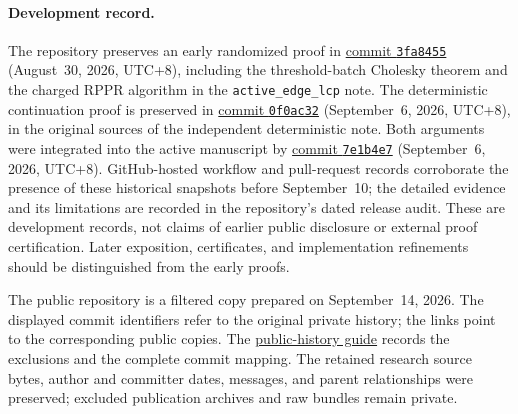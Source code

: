 \paragraph{Development record.}
The repository preserves an early randomized proof in
\href{https://github.com/baojian/hybrid-local-solver/commit/9ebb285da402e0ddf3cdc621240b5502a822b61f}{commit \texttt{3fa8455}}
(August~30, 2026, UTC+8), including the threshold-batch Cholesky theorem
and the charged RPPR algorithm in the \texttt{active\_edge\_lcp} note.
The deterministic continuation proof is preserved in
\href{https://github.com/baojian/hybrid-local-solver/commit/d97d280560ba8dd085813d11737dad96c2552221}{commit \texttt{0f0ac32}}
(September~6, 2026, UTC+8), in the original sources of the independent
deterministic note. Both arguments were integrated into the active
manuscript by
\href{https://github.com/baojian/hybrid-local-solver/commit/cb67f5fd258e039fe931a1c99f6d98ec3ec3141f}{commit \texttt{7e1b4e7}}
(September~6, 2026, UTC+8).
GitHub-hosted workflow and pull-request records corroborate the presence
of these historical snapshots before September~10; the detailed evidence
and its limitations are recorded in the repository's dated release audit.
These are development records, not claims of earlier public disclosure
or external proof certification. Later exposition, certificates, and
implementation refinements should be distinguished from the early proofs.

The public repository is a filtered copy prepared on September~14, 2026.
The displayed commit identifiers refer to the original private history;
the links point to the corresponding public copies. The
\href{https://github.com/baojian/hybrid-local-solver/blob/main/docs/public-release/README.md}{public-history guide}
records the exclusions and the complete commit mapping. The retained research
source bytes, author and committer dates, messages, and parent relationships
were preserved; excluded publication archives and raw bundles remain private.
